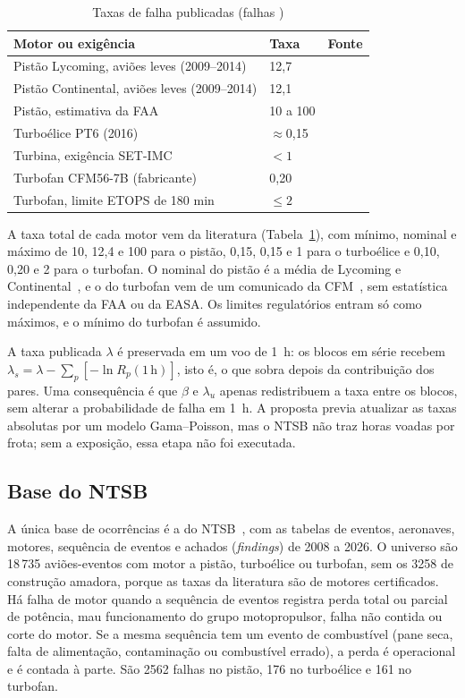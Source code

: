 \begin{table}[t]
  \caption{Taxas de falha publicadas (falhas \pcmh)}
  \label{tab:taxas}
  \centering
  \begin{tabular}{@{}lll@{}}
    \toprule
    Motor ou exigência & Taxa & Fonte \\
    \midrule
    Pistão Lycoming, aviões leves (2009--2014) & 12,7 & \cite{atsb2016} \\
    Pistão Continental, aviões leves (2009--2014) & 12,1 & \cite{atsb2016} \\
    Pistão, estimativa da FAA & 10 a 100 & \cite{romeyn2007} \\
    Turboélice PT6 (2016) & $\approx$0,15 & \cite{stobie2019} \\
    Turbina, exigência SET-IMC & $<1$ & \cite{easa2017} \\
    Turbofan CFM56-7B (fabricante) & 0,20 & \cite{cfm2012} \\
    Turbofan, limite ETOPS de 180 min & $\le 2$ & \cite{cfr25k} \\
    \bottomrule
  \end{tabular}
\end{table}

A taxa total de cada motor vem da literatura (Tabela~\ref{tab:taxas}), com mínimo, nominal e máximo de 10, 12,4 e 100 \pcmh{} para o pistão, 0,15, 0,15 e 1 para o turboélice e 0,10, 0,20 e 2 para o turbofan.
O nominal do pistão é a média de Lycoming e Continental~\cite{atsb2016}, e o do turbofan vem de um comunicado da CFM~\cite{cfm2012}, sem estatística independente da FAA ou da EASA.
Os limites regulatórios entram só como máximos, e o mínimo do turbofan é assumido.

A taxa publicada $\lambda$ é preservada em um voo de 1~h: os blocos em série recebem $\lambda_s=\lambda-\sum_p[-\ln R_p(1\,\mathrm{h})]$, isto é, o que sobra depois da contribuição dos pares.
Uma consequência é que $\beta$ e $\lambda_u$ apenas redistribuem a taxa entre os blocos, sem alterar a probabilidade de falha em 1~h.
A proposta previa atualizar as taxas absolutas por um modelo Gama--Poisson, mas o NTSB não traz horas voadas por frota; sem a exposição, essa etapa não foi executada.

\subsection{Base do NTSB}\label{sec:ntsb}

A única base de ocorrências é a do NTSB~\cite{ntsb}, com as tabelas de eventos, aeronaves, motores, sequência de eventos e achados (\emph{findings}) de 2008 a 2026.
O universo são 18\,735 aviões-eventos com motor a pistão, turboélice ou turbofan, sem os 3258 de construção amadora, porque as taxas da literatura são de motores certificados.
Há falha de motor quando a sequência de eventos registra perda total ou parcial de potência, mau funcionamento do grupo motopropulsor, falha não contida ou corte do motor.
Se a mesma sequência tem um evento de combustível (pane seca, falta de alimentação, contaminação ou combustível errado), a perda é operacional e é contada à parte.
São 2562 falhas no pistão, 176 no turboélice e 161 no turbofan.

